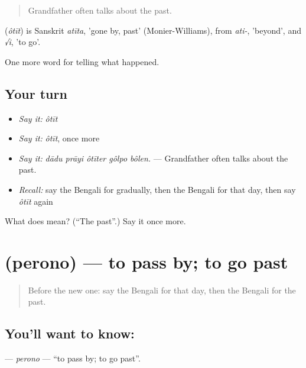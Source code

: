 \begin{quote}
Grandfather often talks about the past.
\end{quote}

\begin{cousinweb}
\textbf{} (\emph{ôtīt}) is Sanskrit \emph{atīta}, 'gone by, past' (Monier-Williams), from \emph{ati-}, 'beyond', and \emph{√i}, 'to go'.
\end{cousinweb}

\begin{grammarlens}[title={What you've built}]
One more word for telling what happened.
\end{grammarlens}

\subsection*{Your turn}
\begin{itemize}
\raggedright
  \item \emph{Say it:} \emph{ôtīt}
  \item \emph{Say it:} \emph{ôtīt}, once more
  \item \emph{Say it:} \emph{dādu prāyi ôtīter gôlpo bôlen.} — Grandfather often talks about the past.
  \item \emph{Recall:} say the Bengali for gradually, then the Bengali for that day, then say \emph{ôtīt} again
\end{itemize}

\begin{tcolorbox}[breakable,colback=teal!4,colframe=teal!35!black,title={Before you move on}]
What does  mean? (\textquotedblleft{}The past\textquotedblright{}.) Say it once more.
\end{tcolorbox}
\section[\texorpdfstring{\bn{পেরোনো} (perono)}{পেরোনো (perono)}]{ (perono) — to pass by; to go past}

\label{lesson:BN-C303-perono}



\begin{quote}
Before the new one: say the Bengali for that day, then the Bengali for the past.
\end{quote}

\subsection*{You'll want to know: }
\textbf{} — \emph{perono} — \textquotedblleft{}to pass by; to go past\textquotedblright{}.

